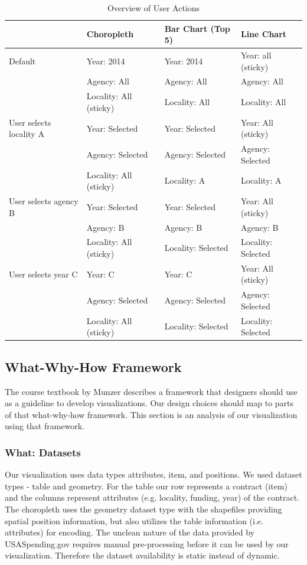 \documentclass[10pt,journal,compsoc]{IEEEtran}
\begin{document}
\begin{table}[t]
\centering
\begin{tabular}{l | l | l | l}
\textbf{} & \textbf{Choropleth} & \textbf{Bar Chart (Top 5)} & \textbf{Line Chart}\\
\hline
Default & Year: 2014 & Year: 2014 & Year: all (sticky)\\
 & Agency: All & Agency: All & Agency: All\\
 & Locality: All (sticky) & Locality: All & Locality: All\\
\hline
User selects locality A & Year: Selected & Year: Selected & Year: All (sticky) \\
 & Agency: Selected & Agency: Selected & Agency: Selected\\
 & Locality: All (sticky) & Locality: A & Locality: A\\
\hline
User selects agency B & Year: Selected & Year: Selected & Year: All (sticky) \\
 & Agency: B & Agency: B & Agency: B\\
 & Locality: All (sticky) & Locality: Selected & Locality: Selected\\
\hline
User selects year C & Year: C & Year: C & Year: All (sticky) \\
& Agency: Selected & Agency: Selected & Agency: Selected\\
& Locality: All (sticky) & Locality: Selected & Locality: Selected\\
\hline
\end{tabular}

\caption{Overview of User Actions}
\label{tab:user-actions}

\end{table} 


\subsection{What-Why-How Framework}

The course textbook by Munzer describes a framework that designers should use as a guideline to develop visualizations. Our design choices should map to parts of that what-why-how framework. This section is an analysis of our visualization using that framework.

\subsubsection{What: Datasets}

Our visualization uses data types attributes, item, and positions. We used dataset types - table and geometry. For the table our row represents a contract (item) and the columns represent attributes (e.g. locality, funding, year) of the contract. The choropleth uses the geometry dataset type with the shapefiles providing spatial position information, but also utilizes the table information (i.e. attributes) for encoding. The unclean nature of the data provided by USASpending.gov requires manual pre-processing before it can be used by our visualization. Therefore the dataset availability is static instead of dynamic.
\end{document}
